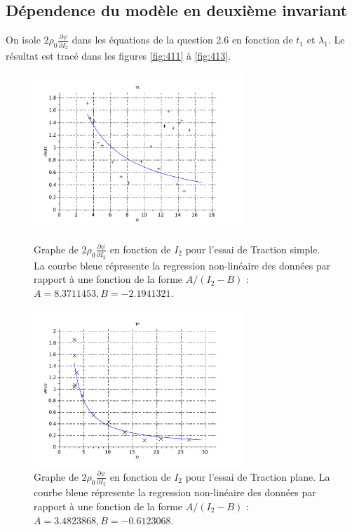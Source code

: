 \documentclass[a4paper,11pt]{article}
\begin{document}
\subsection{Dépendence du modèle en deuxième invariant}
On isole $2 \rho_0 \frac{\partial\psi}{\partial I_2}$ dans les équations de la question 2.6 en fonction de $t_1$ et $\lambda_1$. Le résultat est tracé dans les figures \ref{fig:411} à \ref{fig:413}.
\begin{figure}[ht]
\centering
\includegraphics[width=0.7\textwidth]{scilab_prof/q411.pdf}
\caption{Graphe de $2 \rho_0 \frac{\partial\psi}{\partial I_2}$ en fonction de $I_2$ pour l'essai de Traction simple. La courbe bleue répresente la regression non-linéaire des données par rapport à une fonction de la forme $A/(I_2-B)$ : $A = 8.3711453, B = -2.1941321$.}
\label{fig:411}

\includegraphics[width=0.7\textwidth]{scilab_prof/q412.pdf}
\caption{Graphe de $2 \rho_0 \frac{\partial\psi}{\partial I_2}$ en fonction de $I_2$ pour l'essai de Traction plane. La courbe bleue répresente la regression non-linéaire des données par rapport à une fonction de la forme $A/(I_2-B)$ : $A = 3.4823868, B = -0.6123068$.}
\label{fig:412}
\end{figure}
\end{document}
